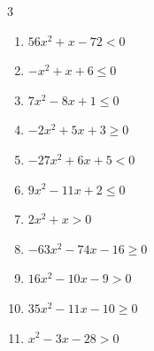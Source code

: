 \begin{multicols}{3}
\begin{enumerate}

  \item $56x^{2}+x-72<0$


\columnbreak %

  \item $-x^{2}+x+6\leq 0$

        \phantom{$\displaystyle x \leqq -2 , \; 3 \leqq x$}

  \item $7x^{2}-8x+1\leq 0$


  \item $-2x^{2}+5x+3\geq 0$


  \item $-27x^{2}+6x+5<0$


  \item $9x^{2}-11x+2\leq 0$


  \item $2x^{2}+x>0$


  \item $-63x^{2}-74x-16\geq 0$


  \item $16x^{2}-10x-9>0$


  \item $35x^{2}-11x-10\geq 0$


  \item $x^{2}-3x-28>0$

        \phantom{$\displaystyle x < -4 , \; 7 < x$}

\columnbreak %

\resetques


\end{enumerate}
\end{multicols}

